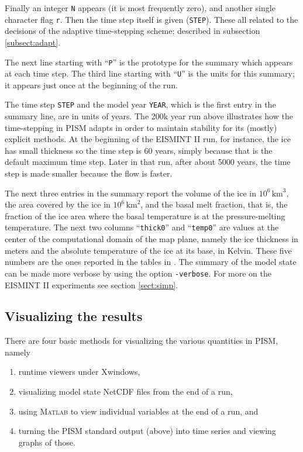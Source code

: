 \documentclass[11pt,final]{amsart}
\renewcommand{\t}[1]{\texttt{#1}}
\newcommand{\Matlab}{\textsc{Matlab}\xspace}
\begin{document}
Finally an integer \t{N} appears (it is most frequently zero), and another single character flag \t{r}.  Then the time step itself is given (\t{STEP}).  These all related to the decisions of the adaptive time-stepping scheme; described in subsection \ref{subsect:adapt}.

The next line starting with ``\t{P}'' is the prototype for the summary which appears at each time step.  The third line starting with ``\t{U}'' is the units for this summary; it appears just once at the beginning of the run.

The time step \t{STEP} and the model year \t{YEAR}, which is the first entry in the summary line, are in units of years.  The 200k year run above illustrates how the time-stepping in PISM adapts in order to maintain stability for its (mostly) explicit methods.  At the beginning of the EISMINT II run, for instance, the ice has small thickness so the time step is 60 years, simply because that is the default maximum time step.  Later in that run, after about 5000 years, the time step is made smaller because the flow is faster.

The next three entries in the summary report the volume of the ice in $10^6 \,\text{km}^3$, the area covered by the ice in $10^6\,\text{km}^2$, and the basal melt fraction, that is, the fraction of the ice area where the basal temperature is at the pressure-melting temperature.  The next two columns ``\texttt{thick0}'' and ``\texttt{temp0}'' are values at the center of the computational domain of the map plane, namely the ice thickness in meters and the absolute temperature of the ice at its base, in Kelvin.  These five numbers are the ones reported in the tables in \cite{EISMINT00}.  The summary of the model state can be made more verbose by using the option \verb|-verbose|.  For more on the EISMINT II experiments see section \ref{sect:simp}.

\subsection{Visualizing the results}  There are four basic methods for visualizing the various quantities in PISM, namely \renewcommand{\labelenumi}{\arabic{enumi})~}  \begin{enumerate}
\item runtime viewers under Xwindows,
\item visualizing model state NetCDF files from the end of a run,
\item using \Matlab to view individual variables at the end of a run, and 
\item turning the PISM standard output (above) into time series and viewing graphs of those.
\end{enumerate}
\end{document}
